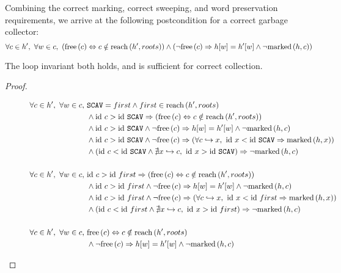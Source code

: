 Combining the correct marking, correct sweeping, and word preservation
requirements, we arrive at the following postcondition for a correct
garbage collector: \[\forall c \in h',\ \forall w \in c,\
(\mathrm{free}\left(c\right) \Leftrightarrow c \notin \mathrm{reach}\left(h', roots\right)) \land (\lnot\mathrm{free}\left(c\right) \Rightarrow
h[w] = h'[w] \land \lnot\mathrm{marked}\left(h, c\right))\]

\begin{theorem}
  The loop invariant both holds, and is sufficient for correct
  collection.
\end{theorem}

\begin{proof}
  \begin{figure}[t]
    \centering
    \begin{align*}
      \forall c \in h',\ \forall w \in c,\ &\mathtt{SCAV} = first \land
        first \in \reach{h'}{roots}\\
%
      &\land \id~c > \id~\mathtt{SCAV} \implies (\free{c}
        \iff c \notin \reach{h'}{roots})\\
%
      &\land \id~c > \id~\mathtt{SCAV} \land \lnot\free{c}
        \implies h[w] = h'[w] \land \lnot \marked{h}{c}\\
%
      &\land \id~c > \id~\mathtt{SCAV} \land \lnot\free{c}
        \implies (\forall c \pointsto x,\ \id~x < \id~\mathtt{SCAV}
        \implies \marked{h}{x})\\
%
      &\land \left(\id~c < \id~\mathtt{SCAV} \land \nexists x \pointsto
        c,\ \id~x > \id~\mathtt{SCAV}\right) \implies
        \lnot\marked{h}{c}\\\\
%
%
      \forall c \in h',\ \forall w \in c,\ & \id~c > \id~first \implies
        (\free{c} \iff c \notin \reach{h'}{roots})\\
%
      &\land \id~c > \id~first \land \lnot\free{c}
        \implies h[w] = h'[w] \land \lnot \marked{h}{c}\\
%
      &\land \id~c > \id~first \land \lnot\free{c}
        \implies (\forall c \pointsto x,\ \id~x < \id~first
        \implies \marked{h}{x})\\
%
      &\land \left(\id~c < \id~first \land \nexists x \pointsto
        c,\ \id~x > \id~first\right) \implies
        \lnot\marked{h}{c}\\\\
%
%
      \forall c \in h',\ \forall w \in c,\ & \free{c} \iff c \notin
        \reach{h'}{roots}\\
%
      &\land \lnot\free{c} \implies h[w] = h'[w] \land \lnot \marked{h}{c}\\

\end{align*}
\end{figure}
\end{proof}
